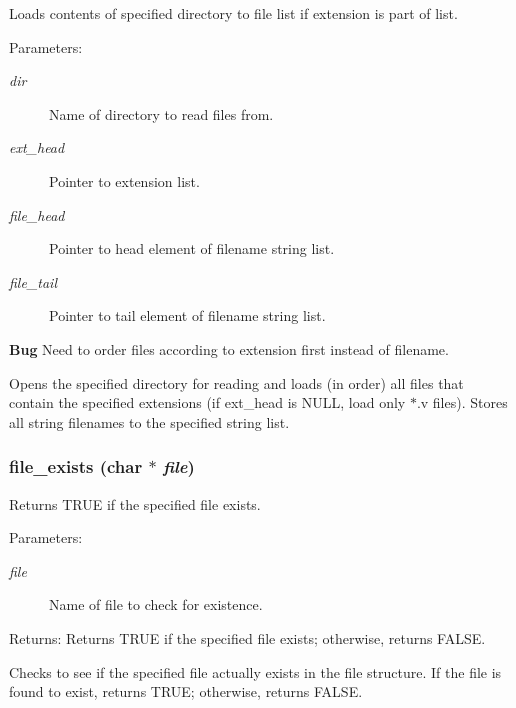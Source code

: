 Loads contents of specified directory to file list if extension is part of list. 

\begin{Desc}
\item[Parameters:]
\begin{description}
\item[{\em dir}]Name of directory to read files from. \item[{\em ext\_\-head}]Pointer to extension list. \item[{\em file\_\-head}]Pointer to head element of filename string list. \item[{\em file\_\-tail}]Pointer to tail element of filename string list.\end{description}
\end{Desc}


\begin{Desc}
\item[{\bf Bug}]Need to order files according to extension first instead of filename. \end{Desc}
Opens the specified directory for reading and loads (in order) all files that contain the specified extensions (if ext\_\-head is NULL, load only $\ast$.v files). Stores all string filenames to the specified string list. 
\subsubsection{ file\_\-exists (char $\ast$ {\em file})}\label{util_8h_a7}


Returns TRUE if the specified file exists. 

\begin{Desc}
\item[Parameters:]
\begin{description}
\item[{\em file}]Name of file to check for existence. \end{description}
\end{Desc}
\begin{Desc}
\item[Returns:]Returns TRUE if the specified file exists; otherwise, returns FALSE.\end{Desc}
Checks to see if the specified file actually exists in the file structure. If the file is found to exist, returns TRUE; otherwise, returns FALSE. 

